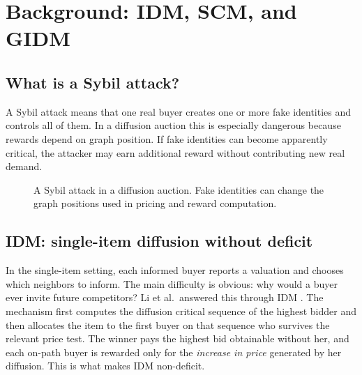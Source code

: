 \documentclass[sigconf]{aamas}
\theoremstyle{definition}
\theoremstyle{remark}
\begin{document}
\section{Background: IDM, SCM, and GIDM}
\subsection{What is a Sybil attack?}
A Sybil attack means that one real buyer creates one or more fake identities and controls all of them. In a diffusion auction this is especially dangerous because rewards depend on graph position. If fake identities can become apparently critical, the attacker may earn additional reward without contributing new real demand.

\begin{figure}[t]
\centering
{}
\caption{A Sybil attack in a diffusion auction. Fake identities can change the graph positions used in pricing and reward computation.}
\label{fig:sybil}
\end{figure}

\subsection{IDM: single-item diffusion without deficit}
In the single-item setting, each informed buyer reports a valuation and chooses which neighbors to inform. The main difficulty is obvious: why would a buyer ever invite future competitors? Li et al.\ answered this through IDM \cite{LiHZZ17}. The mechanism first computes the diffusion critical sequence of the highest bidder and then allocates the item to the first buyer on that sequence who survives the relevant price test. The winner pays the highest bid obtainable without her, and each on-path buyer is rewarded only for the \emph{increase in price} generated by her diffusion. This is what makes IDM non-deficit.
\end{document}
